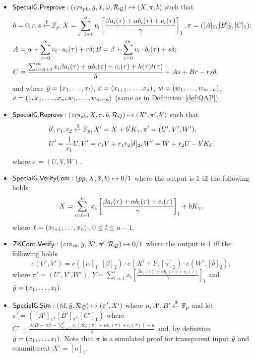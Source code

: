 \begin{definition}
\begin{itemize}
\item ${\mathsf{SpecialG}}.{\mathsf{Preprove}}: (\mathit{crs}_{\mathit{pk}}, \bar{y}, \bar{x}, \bar{\omega}, \mathcal{R}_{\mathcal{Q}}) \mapsto (X, \pi, b)$ such that \\
\begin{align*}
&b = 0; r, s\xleftarrow{\$} \mathbb{F}_p; X = \sum_{i=l+1}^{n} v_i\left[ \frac{\beta a_i(\tau)+ \alpha b_i(\tau)+ c_i(\tau)}{\gamma} \right]_1; \pi = ([A]_1, [B]_2, [C]_1); \\
&A = \alpha + \sum_{i=0}^{m} v_i \cdot a_i(\tau) + r\delta; B = \beta + \sum_{i=0}^{m} v_i \cdot b_i(\tau) + s\delta; \\ 
&C = \frac{\sum_{i=n+1}^{m} v_i \beta a_i(\tau)+ \alpha b_i(\tau)+ c_i(\tau) + h(\tau)t(\tau)}{\delta}   + As + Br - rs\delta, 
\end{align*}
and where $\bar{y} = (x_1, \ldots, x_l)$, $\bar{x} = (x_{l+1}, \ldots, x_n)$, $\bar{w} = (w_1, \ldots, w_{m-n})$, \\
$\bar{v} = (1, x_1, \ldots, x_n, w_1, \ldots, w_{m-n})$ (same as in Definition~\ref{def:QAP}).


\item ${\mathsf{SpecialG}}.{\mathsf{Reprove}}: (\mathit{crs}_{\mathit{pk}}, X, \pi, b, \mathcal{R}_{\mathcal{Q}}) \mapsto (X', \pi', b')$  such that
\begin{align*}
&b ', r_1, r_2  \xleftarrow{\$} \mathbb{F}_p, X' = X + b' K_{\gamma}, \pi' = (U', V', W'), \\
&U' = \frac{1}{r_1} U, V' = r_1 V + r_1r_2[\delta]_2, W' = W + r_2U  - b'K_{\delta} .
\end{align*}
\noindent where $\pi = (U, V, W)$.
 
\item ${\mathsf{SpecialG}}.{\mathsf{VerifyCom}}: (\mathit{pp}, X, \bar{x}, b) \mapsto 0/1$ where the output is 1 iff the following holds
$$X = \sum_{i=l+1}^{n} x_i\left[ \frac{\beta a_i(\tau)+ \alpha b_i(\tau)+ c_i(\tau)}{\gamma} \right]_1  + b K_{\gamma},$$
where $\bar{x} = (x_{l+1}, \ldots, x_n)$, $ 0 \leq l \leq n-1$. 
\item ${\mathsf{ZKCont}}.{\mathsf{Verify}}: (\mathit{crs}_{\mathit{vk}}, \bar{y}, X', \pi', \mathcal{R}_{\mathcal{Q}}) \mapsto 0/1$ where the output is 1 iff the following holds 
$$e(U',V') = e([\alpha]_1, [\beta]_2) \cdot e(X' + Y, [\gamma]_2) \cdot e(W', [\delta]_2),$$
where $\pi' = (U', V', W')$, $Y = \sum_{i=1}^{l} x_i\left[ \frac{\beta a_i(\tau)+ \alpha b_i(\tau)+ c_i(\tau)}{\gamma} \right]_1$ 
and $\bar{y} = (x_1, \ldots, x_l)$.

\item ${\mathsf{SpecialG}}.{\mathsf{Sim}}: (\mathit{td}, \bar{y}, \mathcal{R}_{\mathcal{Q}}) \mapsto (\pi', X')$ where $u, A', B' \xleftarrow {\$} \mathbb{F}_p$ and let \\
$\pi' = ([A']_1, [B']_2, [C']_1)$ where $C' = \frac{A'B' - \alpha \beta - \sum_{i=1}^{l} x_i (\beta a_i(\tau)+ \alpha b_i(\tau)+ c_i(\tau))- u}{\delta}  $ and, 
by definition $\bar{y} = (x_1, \ldots, x_l)$. Note that $\pi$ is a simulated proof for transparent input $\bar{y}$ and commitment $X' = [u]_1$.
\end{itemize} 
\end{definition}

